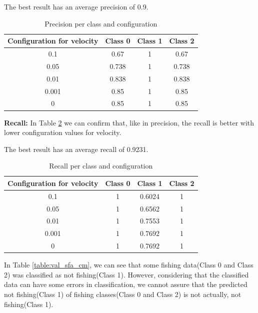 The best result has an average precision of 0.9.


\begin {table}[H]
\caption {Precision per class and configuration}
\begin{center}
\begin{tabular}{c|c|c|c}
Configuration for velocity & \textbf{Class 0} & \textbf{Class 1} & \textbf{Class 2} \\\hline
0.1 & 0.67 & 1 & 0.67 \\
0.05 & 0.738 & 1 & 0.738 \\
0.01 & 0.838 & 1 & 0.838 \\
0.001 & 0.85 & 1 & 0.85 \\
0 & 0.85 & 1 & 0.85 
\label{table:val_sfa_pr}
\end{tabular}
\end{center}
\end {table}


\textbf{Recall:} %
In Table \ref{table:val_sfa_re} we can confirm that, like in precision, the recall is better with lower configuration values for velocity.

The best result has an average recall of 0.9231.

\begin {table}[H]
\caption {Recall per class and configuration}
\begin{center}
\begin{tabular}{c|c|c|c}
Configuration for velocity & \textbf{Class 0} & \textbf{Class 1} & \textbf{Class 2} \\\hline
0.1 & 1 & 0.6024 & 1 \\
0.05 & 1 & 0.6562 & 1 \\
0.01 & 1 & 0.7553 & 1 \\
0.001 &1 & 0.7692 & 1 \\
0 &1 & 0.7692 & 1
\label{table:val_sfa_re}
\end{tabular}
\end{center}
\end {table}

In Table \ref{table:val_sfa_cm}, we can see that some fishing data(Class 0 and Class 2) was classified as not fishing(Class 1). However, considering that the classified data can have some errors in classification, we cannot assure that the predicted not fishing(Class 1) of fishing classes(Class 0 and Class 2) is not actually, not fishing(Class 1). 

